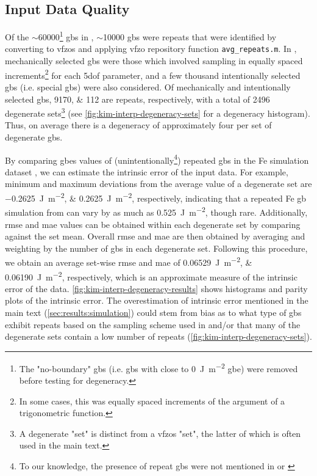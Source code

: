 \documentclass[preprint,12pt]{elsarticle}
\newcommand{\inpt}{input}
\newcommand{\vfzorepo}{\gls{vfzo} repository}
\begin{document}
\subsection{Input Data Quality}
\label{sec:supp:kim-interp:quality}
Of the $\sim$\num{60000}\footnote{The "no-boundary" \glspl{gb} (i.e. \glspl{gb} with close to \SI{0}{\joule\per\square\meter} \gls{gbe}) were removed before testing for degeneracy.} \glspl{gb} in \cite{kimPhasefieldModeling3D2014}, $\sim$\num{10000} \glspl{gb} were repeats that were identified by converting to \glspl{vfzo} and applying \vfzorepo{} function \texttt{avg_repeats.m}. In \cite{kimPhasefieldModeling3D2014}, mechanically selected \glspl{gb} were those which involved sampling in equally spaced increments\footnote{In some cases, this was equally spaced increments of the argument of a trigonometric function.} for each \gls{5dof} parameter, and a few thousand intentionally selected \glspl{gb} (i.e. special \glspl{gb}) were also considered. Of mechanically and intentionally selected \glspl{gb}, \numlist{9170;112} are repeats, respectively, with a total of \num{2496} degenerate sets\footnote{A degenerate "set" is distinct from a \glspl{vfzo} "set", the latter of which is often used in the main text.} (see \cref{fig:kim-interp-degeneracy-sets} for a degeneracy histogram). Thus, on average there is a degeneracy of approximately four per set of degenerate \glspl{gb}.

By comparing \glspl{gbe} values of (unintentionally\footnote{To our knowledge, the presence of repeat \glspl{gb} were not mentioned in \cite{kimIdentificationSchemeGrain2011} or \cite{kimPhasefieldModeling3D2014}}) repeated \glspl{gb} in the Fe simulation dataset \cite{kimPhasefieldModeling3D2014}, we can estimate the intrinsic error of the \inpt{} data. For example, minimum and maximum deviations from the average value of a degenerate set are \SIlist{-0.2625;0.2625}{\joule\per\square\meter}, respectively, indicating that a repeated Fe \gls{gb} simulation from \cite{kimPhasefieldModeling3D2014} can vary by as much as \SI{0.525}{\joule\per\square\meter}, though rare. Additionally, \Gls{rmse} and \gls{mae} values can be obtained within each degenerate set by comparing against the set mean. Overall \gls{rmse} and \gls{mae} are then obtained by averaging and weighting by the number of \glspl{gb} in each degenerate set. Following this procedure, we obtain an average set-wise \gls{rmse} and \gls{mae} of \SIlist{0.06529;0.06190}{\joule\per\square\meter}, respectively, which is an approximate measure of the intrinsic error of the data. \cref{fig:kim-interp-degeneracy-results} shows histograms and parity plots of the intrinsic error. The overestimation of intrinsic error mentioned in the main text (\cref{sec:results:simulation}) could stem from bias as to what type of \glspl{gb} exhibit repeats based on the sampling scheme used in \cite{kimPhasefieldModeling3D2014} and/or that many of the degenerate sets contain a low number of repeats (\cref{fig:kim-interp-degeneracy-sets}).
\end{document}

